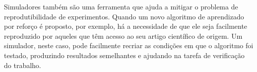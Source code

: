\documentclass[cic,tc]{iiufrgs}
\begin{document}
Simuladores também são uma ferramenta que ajuda a mitigar o problema de reprodutibilidade de experimentos. Quando um novo algoritmo de aprendizado
por reforço é proposto, por exemplo, há a necessidade de que ele seja facilmente reproduzido por aqueles que têm acesso ao seu artigo
científico de origem. Um simulador, neste caso, pode facilmente recriar as condições em que o algoritmo foi testado, produzindo resultados
semelhantes e ajudando na tarefa de verificação do trabalho.




\end{document}
